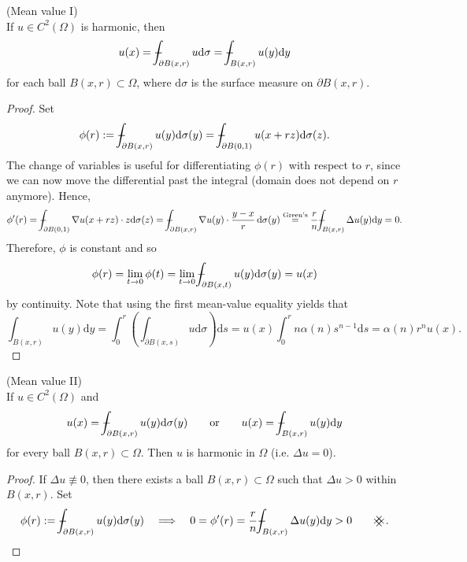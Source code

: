 \documentclass[11pt]{article}
\begin{document}
			\begin{thm}
				(Mean value I)\\ If $u\in C^2(\Omega)$ is harmonic, then
				\begin{equation*}
					u(x)=\dashint_{\partial B(x,r)}u\mathrm{d}
					\sigma=\dashint_{B(x,r)}u(y)\mathrm{d}y
			\end{equation*}
				for each ball $B(x,r)\subset\Omega$, where $\mathrm{d}\sigma$ is the surface measure on $\partial B(x,r)$.
			\end{thm}
			\begin{proof}
				Set 
				\begin{equation*}
					\phi(r):=\dashint_{\partial B(x,r)}u(y)\mathrm{d}\sigma(y)=\dashint_{\partial B(0,1)}u(x+rz)\mathrm{d}\sigma(z).
				\end{equation*}
				The change of variables is useful for differentiating $\phi(r)$ with respect to $r$, since we can now move the differential past the integral (domain does not depend on $r$ anymore). Hence,
				\begin{equation*}
					\phi^\prime(r)=\dashint_{\partial B(0,1)}\nabla u(x+rz)\cdot z\mathrm{d}\sigma(z)=\dashint_{\partial B(x,r)}\nabla u(y)\cdot\frac{y-x}{r}\,\mathrm{d}\sigma(y)\overset{\text{Green's}}{=}\frac{r}{n}\dashint_{B(x,r)}\Delta u(y)\mathrm{d}y=0.
				\end{equation*}
				Therefore, $\phi$ is constant and so
				\begin{equation*}
					\phi(r)=\lim_{t\to0}\phi(t)=\lim_{t\to0}\dashint_{\partial B(x,t)}u(y)\mathrm{d}\sigma(y)=u(x)
				\end{equation*}
				by continuity. Note that using the first mean-value equality yields that
				\begin{equation*}
					\int_{B(x,r)}u(y)\mathrm{d}y=\int_0^r\left(\int_{\partial B(x,s)}u\mathrm{d}\sigma\right)\mathrm{d}s=u(x)\int_0^rn\alpha(n)s^{n-1}\mathrm{d}s=\alpha(n)r^n u(x).
				\end{equation*}
			\end{proof}

			\begin{thm}
				(Mean value II)\\ If $u\in C^2(\Omega)$ and 
				\begin{equation*}
					u(x)=\dashint_{\partial B(x,r)}u(y)\mathrm{d}\sigma(y)\qquad\text{or}\qquad u(x)=\dashint_{B(x,r)}u(y)\mathrm{d}y
				\end{equation*}
				for every ball $B(x,r)\subset\Omega$. Then $u$ is harmonic in $\Omega$ (i.e. $\Delta u=0$).
			\end{thm}
			\begin{proof}
				If $\Delta u\not\equiv0$, then there exists a ball $B(x,r)\subset\Omega$ such that $\Delta u>0$ within $B(x,r)$. Set 
				\begin{equation*}
					\phi(r):=\dashint_{\partial B(x,r)}u(y)\mathrm{d}\sigma(y)\quad\Longrightarrow\quad 0=\phi^\prime(r)=\frac{r}{n}\dashint_{B(x,r)}\Delta u(y)\mathrm{d}y>0\quad\contradiction\,.
				\end{equation*}
			\end{proof}
\end{document}
